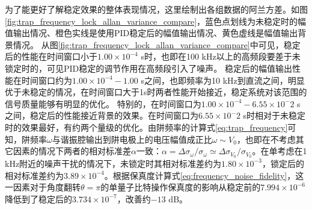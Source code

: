 为了能更好了解稳定效果的整体表现情况，这里绘制出各组数据的阿兰方差。如图\ref{fig:trap_frequency_lock_allan_variance_compare}，蓝色点划线为未稳定时的幅值输出情况、橙色实线是使用PID稳定后的幅值输出情况、黄色虚线是幅值输出背景情况。
从图\ref{fig:trap_frequency_lock_allan_variance_compare}中可见，稳定后的性能在时间窗口小于$1.00\times 10^{-4}$ s时，也即在100 kHz以上的高频段要差于未锁定时的，可见PID稳定的调节作用在高频段引入了噪声。
稳定后的幅值输出性能在时间窗口约为$1.00\times 10^{-4}-1.00$ s之间，也即频率为10 kHz到直流之间，明显优于未稳定的情况，在时间窗口大于1s时两者性能开始接近，稳定系统对该范围的信号质量能够有明显的优化。
特别的，在时间窗口为$1.00\times 10^{-4}-6.55\times 10^-2$ s之间，稳定后的性能接近背景的效果。在时间窗口为$6.55\times 10^-2$ s时相对于未稳定时的效果最好，有约两个量级的优化。由阱频率的计算式\eqref{eq:trap_frequency}可知，阱频率$\omega$与谐振腔输出到阱电极上的电压幅值成正比$\omega\sim V_0$，也即在不考虑其它因素的情况下两者的相对标准差$\alpha$一致：$\alpha=\Delta\sigma_{\omega}/\sigma_{\omega}\simeq\Delta\sigma_{V_0}/\sigma_{V_0}$。在单考虑在1 kHz附近的噪声干扰的情况下，未锁定时其相对标准差约为$1.80\times10^{-3}$，锁定后的相对标准差约为$3.89\times10^{-4}$。根据保真度计算式\eqref{eq:frequency_noise_fidelity}，这一因素对于角度翻转$\theta=\pi$的单量子比特操作保真度的影响从稳定前的$7.994\times10^{-6}$降低到了稳定后的$3.734\times10^{-7}$，改善约$-13$ dB。










